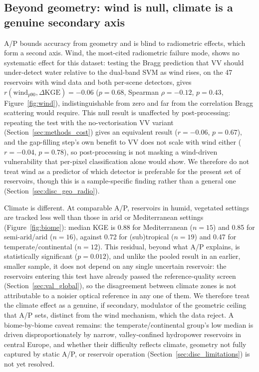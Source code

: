 \subsection{Beyond geometry: wind is null, climate is a genuine secondary axis}
\label{sec:res_climate}

A/P bounds accuracy from geometry and is blind to radiometric effects, which
form a second axis. Wind, the most-cited radiometric failure mode, shows no
systematic effect for this dataset: testing the Bragg prediction
\citep{Valenzuela1978} that VV should under-detect water relative to the
dual-band SVM as wind rises, on the 47 reservoirs with wind data and both
per-scene detectors, gives $r(\text{wind}_{p90}, \Delta\text{KGE}) = -0.06$
($p = 0.68$, Spearman $\rho = -0.12$, $p = 0.43$, Figure~\ref{fig:wind}),
indistinguishable from zero and far from the correlation Bragg scattering
would require. This null result is unaffected by post-processing: repeating
the test with the no-vectorisation VV variant (Section~\ref{sec:methods_cost})
gives an equivalent result ($r=-0.06$, $p=0.67$), and the gap-filling step's
own benefit to VV does not scale with wind either ($r=-0.04$, $p=0.78$), so
post-processing is not masking a wind-driven vulnerability that per-pixel
classification alone would show. We therefore do not treat wind as a
predictor of which detector is preferable for the present set of reservoirs,
though this is a sample-specific finding rather than a general one
(Section~\ref{sec:disc_geo_radio}).

Climate is different. At comparable A/P, reservoirs in humid, vegetated
settings are tracked less well than those in arid or Mediterranean settings
(Figure~\ref{fig:biome}): median KGE is 0.88 for Mediterranean ($n=15$) and
0.85 for semi-arid/arid ($n=16$), against 0.72 for (sub)tropical ($n=19$) and
0.47 for temperate/continental ($n=12$). This residual, beyond what A/P
explains, is statistically significant ($p = 0.012$), and unlike the pooled
result in an earlier, smaller sample, it does not depend on any single
uncertain reservoir: the reservoirs entering this test have already passed the
reference-quality screen (Section~\ref{sec:val_global}), so the disagreement
between climate zones is not attributable to a noisier optical reference in
any one of them. We therefore treat the climate effect as a genuine, if
secondary, modulator of the geometric ceiling that A/P sets, distinct from
the wind mechanism, which the data reject. A biome-by-biome caveat remains:
the temperate/continental group's low median is driven disproportionately by
narrow, valley-confined hydropower reservoirs in central Europe, and whether
their difficulty reflects climate, geometry not fully captured by static A/P,
or reservoir operation (Section~\ref{sec:disc_limitations}) is not yet
resolved.

